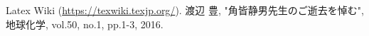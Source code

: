 \documentclass[a4paper,10pt,twocolumn,uplatex]{jsarticle}
\begin{document}



\footnotesize{
  \begin{thebibliography}{99}
     Latex Wiki (\url{https://texwiki.texjp.org/}).
     渡辺 豊, "角皆静男先生のご逝去を悼む", 地球化学, vol.50, no.1, pp.1-3, 2016.
  \end{thebibliography}
}

\end{document}
